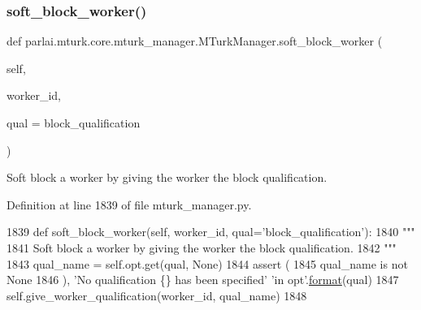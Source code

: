 \mbox{\label{classparlai_1_1mturk_1_1core_1_1mturk__manager_1_1MTurkManager_aa9b385ef48553d3150e195fe82d24c88}} 
\subsubsection{\texorpdfstring{soft\+\_\+block\+\_\+worker()}{soft\_block\_worker()}}
{\footnotesize\ttfamily def parlai.\+mturk.\+core.\+mturk\+\_\+manager.\+M\+Turk\+Manager.\+soft\+\_\+block\+\_\+worker (\begin{DoxyParamCaption}\item[{}]{self,  }\item[{}]{worker\+\_\+id,  }\item[{}]{qual = {\ttfamily \textquotesingle{}block\+\_\+qualification\textquotesingle{}} }\end{DoxyParamCaption})}

\begin{DoxyVerb}Soft block a worker by giving the worker the block qualification.
\end{DoxyVerb}
 

Definition at line 1839 of file mturk\+\_\+manager.\+py.


\begin{DoxyCode}
1839     \textcolor{keyword}{def }soft\_block\_worker(self, worker\_id, qual='block\_qualification'):
1840         \textcolor{stringliteral}{"""}
1841 \textcolor{stringliteral}{        Soft block a worker by giving the worker the block qualification.}
1842 \textcolor{stringliteral}{        """}
1843         qual\_name = self.opt.get(qual, \textcolor{keywordtype}{None})
1844         \textcolor{keyword}{assert} (
1845             qual\_name \textcolor{keywordflow}{is} \textcolor{keywordflow}{not} \textcolor{keywordtype}{None}
1846         ), \textcolor{stringliteral}{'No qualification \{\} has been specified'} \textcolor{stringliteral}{'in opt'}.\hyperlink{namespaceparlai_1_1chat__service_1_1services_1_1messenger_1_1shared__utils_a32e2e2022b824fbaf80c747160b52a76}{format}(qual)
1847         self.give\_worker\_qualification(worker\_id, qual\_name)
1848 
\end{DoxyCode}
\mbox{\label{classparlai_1_1mturk_1_1core_1_1mturk__manager_1_1MTurkManager_a02acff72f25ec7a77edca9489fe3b804}} 

